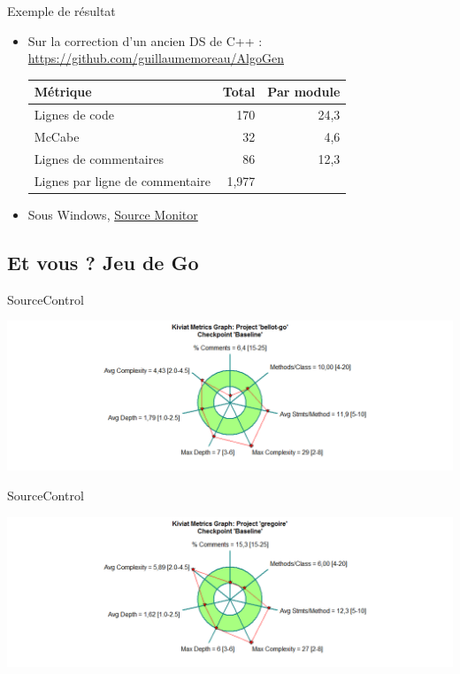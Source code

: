 \begin{frame}{Exemple de résultat}
\begin{itemize}
\item Sur la correction d'un ancien DS de C++ : \url{https://github.com/guillaumemoreau/AlgoGen}


\begin{center}
\begin{tabular}{|l|r|r|}
\hline \textbf{Métrique} & \textbf{Total} & \textbf{Par module} \\ 
\hline Lignes de code & 170 & 24,3 \\ 
\hline McCabe & 32 & 4,6 \\
\hline Lignes de commentaires & 86 & 12,3 \\
\hline Lignes par ligne de commentaire & 1,977 & \\
\hline 
\end{tabular} 
\end{center}

\item Sous Windows, \href{http://www.campwoodsw.com/sourcemonitor.html}{Source Monitor}
\end{itemize}


\end{frame}

\subsection{Et vous ? Jeu de Go}

\begin{frame}{SourceControl}
\begin{center}
\includegraphics[width=\textwidth]{fig/bellot-go-20150105.png}
\end{center}
\end{frame}

\begin{frame}{SourceControl}
\begin{center}
\includegraphics[width=\textwidth]{fig/gregoire-go-20150105.png}
\end{center}
\end{frame}

